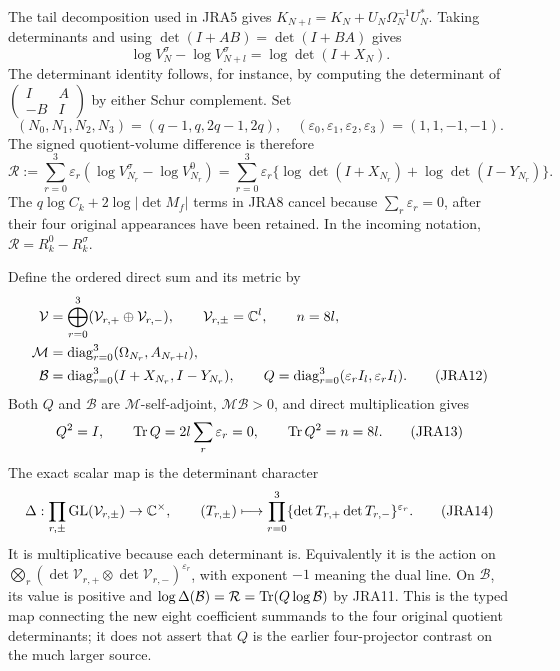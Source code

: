 The tail decomposition used in JRA5 gives
$K_{N+l}=K_N+U_N\Omega_N^{-1}U_N^*$.
Taking determinants and using $\det(I+AB)=\det(I+BA)$ gives
\begin{equation}
 \log V_N^\sigma-\log V_{N+l}^\sigma=\log\det(I+X_N).
 \tag{JRA9}
\end{equation}
The determinant identity follows, for instance, by computing the
determinant of $\left(\begin{smallmatrix}I&A\\-B&I\end{smallmatrix}\right)$
by either Schur complement.
Set
\begin{equation}
 (N_0,N_1,N_2,N_3)=(q-1,q,2q-1,2q),\quad
 (\varepsilon_0,\varepsilon_1,\varepsilon_2,\varepsilon_3)=(1,1,-1,-1).
 \tag{JRA10}
\end{equation}
The signed quotient-volume difference is therefore
\begin{equation}
 \mathcal R:=\sum_{r=0}^3\varepsilon_r
             (\log V_{N_r}^\sigma-\log V_{N_r}^0)
 =\sum_{r=0}^3\varepsilon_r
       \{\log\det(I+X_{N_r})+\log\det(I-Y_{N_r})\}.
 \tag{JRA11}
\end{equation}
The $q\log C_k+2\log|\det M_f|$ terms in JRA8 cancel because
$\sum_r\varepsilon_r=0$, after their four original appearances have
been retained. In the incoming notation, $\mathcal R=R_k^0-R_k^\sigma$.

Define the ordered direct sum and its metric by
\begin{align}
 \mathcal V&=\bigoplus_{r=0}^3
             (\mathcal V_{r,+}\oplus\mathcal V_{r,-}),\qquad
 \mathcal V_{r,\pm}=\mathbb C^l,\qquad n=8l,\notag\\
 \mathcal M&=\operatorname{diag}_{r=0}^3(\Omega_{N_r},A_{N_r+l}),\notag\\
 \mathcal B&=\operatorname{diag}_{r=0}^3(I+X_{N_r},I-Y_{N_r}),\qquad
 Q=\operatorname{diag}_{r=0}^3(\varepsilon_r I_l,\varepsilon_r I_l).
 \tag{JRA12}
\end{align}
Both $Q$ and $\mathcal B$ are $\mathcal M$-self-adjoint,
$\mathcal M\mathcal B>0$, and direct multiplication gives
\begin{equation}
 Q^2=I,\qquad \operatorname{Tr} Q=2l\sum_r\varepsilon_r=0,
 \qquad \operatorname{Tr} Q^2=n=8l.\tag{JRA13}
\end{equation}
The exact scalar map is the determinant character
\begin{equation}
 \Delta:\prod_{r,\pm}\operatorname{GL}(\mathcal V_{r,\pm})\to\mathbb C^\times,
 \qquad (T_{r,\pm})\longmapsto
       \prod_{r=0}^3\{\det T_{r,+}\det T_{r,-}\}^{\varepsilon_r}.
 \tag{JRA14}
\end{equation}
It is multiplicative because each determinant is. Equivalently it is the
action on $\bigotimes_r(\det\mathcal V_{r,+}\otimes
\det\mathcal V_{r,-})^{\varepsilon_r}$, with exponent $-1$ meaning the
dual line. On $\mathcal B$, its value is positive and
$\log\Delta(\mathcal B)=\mathcal R=\operatorname{Tr}(Q\log\mathcal B)$ by JRA11.
This is the typed map connecting the new eight coefficient summands to
the four original quotient determinants; it does not assert that $Q$
is the earlier four-projector contrast on the much larger source.

